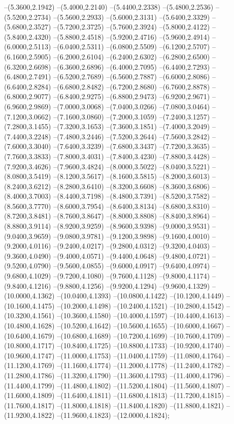 {	--(5.3600,2.1942)
	--(5.4000,2.2140)
	--(5.4400,2.2338)
	--(5.4800,2.2536)
	--(5.5200,2.2734)
	--(5.5600,2.2933)
	--(5.6000,2.3131)
	--(5.6400,2.3329)
	--(5.6800,2.3527)
	--(5.7200,2.3725)
	--(5.7600,2.3924)
	--(5.8000,2.4122)
	--(5.8400,2.4320)
	--(5.8800,2.4518)
	--(5.9200,2.4716)
	--(5.9600,2.4914)
	--(6.0000,2.5113)
	--(6.0400,2.5311)
	--(6.0800,2.5509)
	--(6.1200,2.5707)
	--(6.1600,2.5905)
	--(6.2000,2.6104)
	--(6.2400,2.6302)
	--(6.2800,2.6500)
	--(6.3200,2.6698)
	--(6.3600,2.6896)
	--(6.4000,2.7095)
	--(6.4400,2.7293)
	--(6.4800,2.7491)
	--(6.5200,2.7689)
	--(6.5600,2.7887)
	--(6.6000,2.8086)
	--(6.6400,2.8284)
	--(6.6800,2.8482)
	--(6.7200,2.8680)
	--(6.7600,2.8878)
	--(6.8000,2.9077)
	--(6.8400,2.9275)
	--(6.8800,2.9473)
	--(6.9200,2.9671)
	--(6.9600,2.9869)
	--(7.0000,3.0068)
	--(7.0400,3.0266)
	--(7.0800,3.0464)
	--(7.1200,3.0662)
	--(7.1600,3.0860)
	--(7.2000,3.1059)
	--(7.2400,3.1257)
	--(7.2800,3.1455)
	--(7.3200,3.1653)
	--(7.3600,3.1851)
	--(7.4000,3.2049)
	--(7.4400,3.2248)
	--(7.4800,3.2446)
	--(7.5200,3.2644)
	--(7.5600,3.2842)
	--(7.6000,3.3040)
	--(7.6400,3.3239)
	--(7.6800,3.3437)
	--(7.7200,3.3635)
	--(7.7600,3.3833)
	--(7.8000,3.4031)
	--(7.8400,3.4230)
	--(7.8800,3.4428)
	--(7.9200,3.4626)
	--(7.9600,3.4824)
	--(8.0000,3.5022)
	--(8.0400,3.5221)
	--(8.0800,3.5419)
	--(8.1200,3.5617)
	--(8.1600,3.5815)
	--(8.2000,3.6013)
	--(8.2400,3.6212)
	--(8.2800,3.6410)
	--(8.3200,3.6608)
	--(8.3600,3.6806)
	--(8.4000,3.7003)
	--(8.4400,3.7198)
	--(8.4800,3.7391)
	--(8.5200,3.7582)
	--(8.5600,3.7770)
	--(8.6000,3.7954)
	--(8.6400,3.8134)
	--(8.6800,3.8310)
	--(8.7200,3.8481)
	--(8.7600,3.8647)
	--(8.8000,3.8808)
	--(8.8400,3.8964)
	--(8.8800,3.9114)
	--(8.9200,3.9259)
	--(8.9600,3.9398)
	--(9.0000,3.9531)
	--(9.0400,3.9659)
	--(9.0800,3.9781)
	--(9.1200,3.9898)
	--(9.1600,4.0010)
	--(9.2000,4.0116)
	--(9.2400,4.0217)
	--(9.2800,4.0312)
	--(9.3200,4.0403)
	--(9.3600,4.0490)
	--(9.4000,4.0571)
	--(9.4400,4.0648)
	--(9.4800,4.0721)
	--(9.5200,4.0790)
	--(9.5600,4.0855)
	--(9.6000,4.0917)
	--(9.6400,4.0974)
	--(9.6800,4.1029)
	--(9.7200,4.1080)
	--(9.7600,4.1128)
	--(9.8000,4.1174)
	--(9.8400,4.1216)
	--(9.8800,4.1256)
	--(9.9200,4.1294)
	--(9.9600,4.1329)
	--(10.0000,4.1362)
	--(10.0400,4.1393)
	--(10.0800,4.1422)
	--(10.1200,4.1449)
	--(10.1600,4.1475)
	--(10.2000,4.1498)
	--(10.2400,4.1521)
	--(10.2800,4.1542)
	--(10.3200,4.1561)
	--(10.3600,4.1580)
	--(10.4000,4.1597)
	--(10.4400,4.1613)
	--(10.4800,4.1628)
	--(10.5200,4.1642)
	--(10.5600,4.1655)
	--(10.6000,4.1667)
	--(10.6400,4.1679)
	--(10.6800,4.1689)
	--(10.7200,4.1699)
	--(10.7600,4.1709)
	--(10.8000,4.1717)
	--(10.8400,4.1725)
	--(10.8800,4.1733)
	--(10.9200,4.1740)
	--(10.9600,4.1747)
	--(11.0000,4.1753)
	--(11.0400,4.1759)
	--(11.0800,4.1764)
	--(11.1200,4.1769)
	--(11.1600,4.1774)
	--(11.2000,4.1778)
	--(11.2400,4.1782)
	--(11.2800,4.1786)
	--(11.3200,4.1790)
	--(11.3600,4.1793)
	--(11.4000,4.1796)
	--(11.4400,4.1799)
	--(11.4800,4.1802)
	--(11.5200,4.1804)
	--(11.5600,4.1807)
	--(11.6000,4.1809)
	--(11.6400,4.1811)
	--(11.6800,4.1813)
	--(11.7200,4.1815)
	--(11.7600,4.1817)
	--(11.8000,4.1818)
	--(11.8400,4.1820)
	--(11.8800,4.1821)
	--(11.9200,4.1822)
	--(11.9600,4.1823)
	--(12.0000,4.1824);
}

